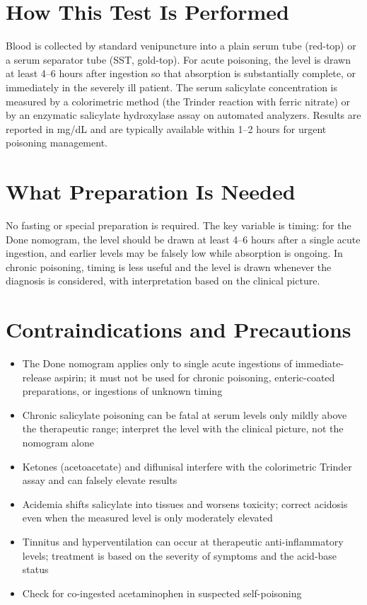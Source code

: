 \section*{How This Test Is Performed}
Blood is collected by standard venipuncture into a plain serum tube (red-top) or a serum separator tube (SST, gold-top). For acute poisoning, the level is drawn at least 4--6 hours after ingestion so that absorption is substantially complete, or immediately in the severely ill patient. The serum salicylate concentration is measured by a colorimetric method (the Trinder reaction with ferric nitrate) or by an enzymatic salicylate hydroxylase assay on automated analyzers. Results are reported in mg/dL and are typically available within 1--2 hours for urgent poisoning management.
\section*{What Preparation Is Needed}
No fasting or special preparation is required. The key variable is timing: for the Done nomogram, the level should be drawn at least 4--6 hours after a single acute ingestion, and earlier levels may be falsely low while absorption is ongoing. In chronic poisoning, timing is less useful and the level is drawn whenever the diagnosis is considered, with interpretation based on the clinical picture.
\section*{Contraindications and Precautions}
\begin{itemize}
  \item The Done nomogram applies only to single acute ingestions of immediate-release aspirin; it must not be used for chronic poisoning, enteric-coated preparations, or ingestions of unknown timing
  \item Chronic salicylate poisoning can be fatal at serum levels only mildly above the therapeutic range; interpret the level with the clinical picture, not the nomogram alone \cite{chyka2007salicylate}
  \item Ketones (acetoacetate) and diflunisal interfere with the colorimetric Trinder assay and can falsely elevate results
  \item Acidemia shifts salicylate into tissues and worsens toxicity; correct acidosis even when the measured level is only moderately elevated
  \item Tinnitus and hyperventilation can occur at therapeutic anti-inflammatory levels; treatment is based on the severity of symptoms and the acid-base status
  \item Check for co-ingested acetaminophen in suspected self-poisoning
\end{itemize}
